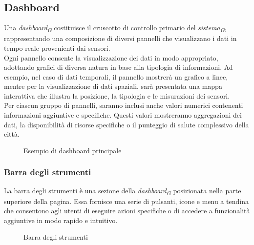 \subsection{Dashboard}
Una \textit{dashboard}\textsubscript{\textit{G}} costituisce il cruscotto di controllo primario del \textit{sistema}\textsubscript{\textit{G}}, rappresentando una composizione di diversi pannelli che visualizzano i dati in tempo reale provenienti dai sensori. \\
Ogni pannello consente la visualizzazione dei dati in modo appropriato, adottando grafici di diversa natura in base alla tipologia di informazioni. Ad esempio, nel caso di dati temporali, il pannello mostrerà un grafico a linee, mentre per la visualizzazione di dati spaziali, sarà presentata una mappa interattiva che illustra la posizione, la tipologia e le misurazioni dei sensori.\\
Per ciascun gruppo di pannelli, saranno inclusi anche valori numerici contenenti informazioni aggiuntive e specifiche. Questi valori mostreranno aggregazioni dei dati, la disponibilità di risorse specifiche o il punteggio di salute complessivo della città. \\
\begin{figure}[H]
    \centering
    \caption{Esempio di dashboard principale}
    \label{fig:my_label}
\end{figure}


\subsubsection{Barra degli strumenti}
\label{sec:barra_strumenti}
La barra degli strumenti è una sezione della \textit{dashboard}\textsubscript{\textit{G}} posizionata nella parte superiore della pagina. Essa fornisce una serie di pulsanti, icone e menu a tendina che consentono agli utenti di eseguire azioni specifiche o di accedere a funzionalità aggiuntive in modo rapido e intuitivo. \\
\begin{figure}[H]
    \centering
    \caption{Barra degli strumenti}
    \label{fig:my_label}
\end{figure}


